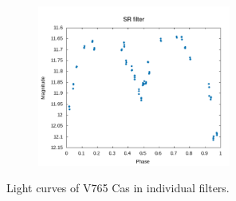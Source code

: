 \documentclass[linenumbers]{aastex631}
\begin{document}
\begin{figure}[H]
\begin{subfigure}{}
  \end{subfigure}
  \begin{subfigure}{}
    \includegraphics[width=2.5in]{Figures/SR.png}
  \end{subfigure}
  \caption{Light curves of V765 Cas in individual filters.}
  \label{fig:indivlightcurves}
\end{figure}

{}

\end{document}

